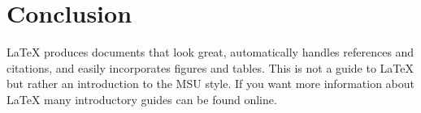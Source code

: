 \chapter{Conclusion}\label{conclusion}

\LaTeX{} produces documents that look great, automatically handles references and citations, and easily incorporates figures and tables.  This is not a guide to \LaTeX{} but rather an introduction to the MSU style.  If you want more information about \LaTeX{} many introductory guides can be found online.